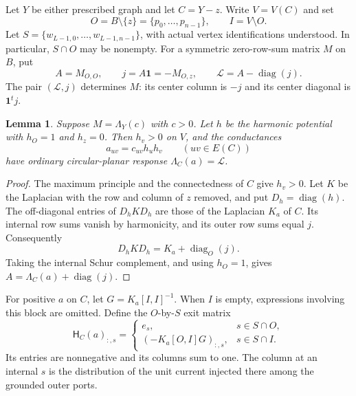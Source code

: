 \documentclass[11pt]{article}
\newtheorem{lemma}[theorem]{Lemma}
\theoremstyle{definition}
\newcommand{\one}{\mathbf 1}
\newcommand{\diag}{\operatorname{diag}}
\newcommand{\exitmat}{\mathsf H}
\begin{document}
Let $Y$ be either prescribed graph and let $C=Y-z$. Write
$V=V(C)$ and set
\[
 O=B\setminus\{z\}=\{p_0,\ldots,p_{n-1}\},\qquad
 I=V\setminus O.
\]
Let
$S=\{w_{L-1,0},\ldots,w_{L-1,n-1}\}$, with actual vertex
identifications understood. In particular, $S\cap O$ may be nonempty.
For a symmetric zero-row-sum matrix $M$ on $B$, put
\begin{equation}
 A=M_{O,O},\qquad j=A\one=-M_{O,z},\qquad
 \mathcal L=A-\diag(j).
 \label{eq:split}
\end{equation}
The pair $(\mathcal L,j)$ determines $M$: its center column is
$-j$ and its center diagonal is $\one^tj$.

\begin{lemma}
\label{lem:groundstate}
Suppose $M=\Lambda_Y(c)$ with $c>0$. Let $h$ be the harmonic
potential with $h_O=1$ and $h_z=0$. Then $h_v>0$ on $V$, and
the conductances
\[
 a_{uv}=c_{uv}h_uh_v\qquad(uv\in E(C))
\]
have ordinary circular-planar response $\Lambda_C(a)=\mathcal L$.
\end{lemma}
\begin{proof}
The maximum principle and the connectedness of $C$ give $h_v>0$.
Let $K$ be the Laplacian with the row and column of $z$ removed,
and put $D_h=\diag(h)$. The off-diagonal entries of $D_hKD_h$
are those of the Laplacian $K_a$ of $C$. Its internal row sums
vanish by harmonicity, and its outer row sums equal $j$.
Consequently
\begin{equation}
 D_hKD_h=K_a+\diag_O(j).
 \label{eq:groundstate-matrix}
\end{equation}
Taking the internal Schur complement, and using $h_O=1$, gives
$A=\Lambda_C(a)+\diag(j)$.
\end{proof}

For positive $a$ on $C$, let $G=K_a[I,I]^{-1}$. When $I$ is
empty, expressions involving this block are omitted. Define the
$O$-by-$S$ exit matrix
\begin{equation}
 \exitmat_C(a)_{:,s}=
 \begin{cases}
 e_s,&s\in S\cap O,\\
 (-K_a[O,I]G)_{:,s},&s\in S\cap I.
 \end{cases}
 \label{eq:exit-matrix}
\end{equation}
Its entries are nonnegative and its columns sum to one. The column
at an internal $s$ is the distribution of the unit current injected
there among the grounded outer ports.
\end{document}
